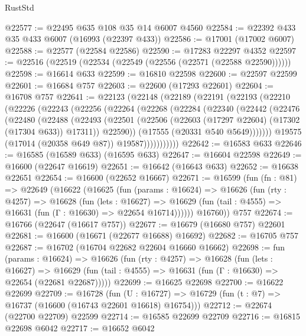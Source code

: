 \begin{lexlean}{RustStd}
\begin{coremodule}
{\begin{coremodule}
{{{{{{{{{{{{{{{{{{{{{{{{{{{{{{{{{{{{{{{{{{{{{{{{{{{{{{{@22577 := @22495 @635 @108 @35 @14 @6007 @4560
@22584 := @22392 @433 @35 @433 @6007 (@16993 (@22397 @433))
@22586 := @17001 (@17002 @6007)
@22588 := @22577 (@22584 @22586)
@22590 := @17283 @22297 @4352
@22597 := @22516 (@22519 (@22534 (@22549 (@22556 (@22571 (@22588 @22590))))))
@22598 := @16614 @633
@22599 := @16810 @22598
@22600 := @22597 @22599
@22601 := @16684 @757
@22603 := @22600 (@17293 @22601)
@22604 := @16708 @757
@22641 := @22123
    (@22148
      (@22189
        (@22191
          (@22193
            (@22210
              (@22226
                (@22243
                  (@22256
                    (@22264
                      (@22268
                        (@22284
                          (@22340
                            (@22442
                              (@22476
                                (@22480
                                  (@22488
                                    (@22493
                                      (@22501
                                        (@22506
                                          (@22603 (@17297 @22604) (@17302 (@17304 @633)) @17311))
                                        @22590))
                                    (@17555 (@20331 @540 @5649)))))))
                          @19575
                          (@17014 (@20358 @649 @87))
                          @19587)))))))))))
@22642 := @16583 @633
@22646 := @16585 (@16589 @633) (@16595 @633)
@22647 := @16604 @22598
@22649 := @16600 (@22647 @16619)
@22651 := @16642 (@16643 @633)
@22652 := @16638 @22651
@22654 := @16600 (@22652 @16667)
@22671 := @16599
    (fun (fn : @81) =>
    @22649
      (@16622
        (@16625
          (fun (params : @16624) =>
          @16626
            (fun (rty : @4257) =>
            @16628
              (fun (lets : @16627) =>
              @16629 (fun (tail : @4555) => @16631 (fun (Γ : @16630) => @22654 @16714))))))
        @16760))
    @757
@22674 := @16766 (@22647 (@16617 @757))
@22677 := @16679 (@16680 @757) @22601
@22681 := @16600 (@16671 (@22677 @16688) @16692)
@22682 := @16705 @757
@22687 := @16702 (@16704 @22682 @22604 @16660 @16662)
@22698 := fun (params : @16624) =>
  @16626
    (fun (rty : @4257) =>
    @16628
      (fun (lets : @16627) =>
      @16629 (fun (tail : @4555) => @16631 (fun (Γ : @16630) => @22654 (@22681 @22687)))))
@22699 := @16625 @22698
@22700 := @16622 @22699
@22709 := @16728
    (fun (U : @16727) => @16729 (fun (t : @7) => @16737 (@16600 (@16743 @22601 @16618) @16754)))
@22712 := @22674 (@22700 @22709) @22599
@22714 := @16585 @22699 @22709
@22716 := @16815 @22698 @6042
@22717 := @16652 @6042
}}}}}}}}}}}}}}}}}}}}}}}}}}}}}}}}}}}}}}}}}}}}}}}}}}}}}}}
\end{coremodule}}
\end{coremodule}
\end{lexlean}
